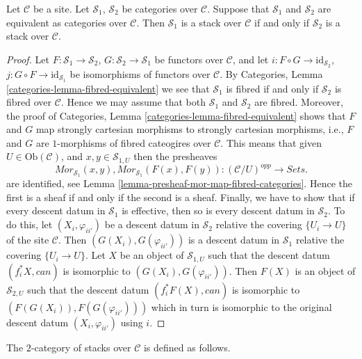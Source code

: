 \begin{lemma}
\label{lemma-stack-equivalent}
Let $\mathcal{C}$ be a site.
Let $\mathcal{S}_1$, $\mathcal{S}_2$ be categories over $\mathcal{C}$.
Suppose that $\mathcal{S}_1$ and $\mathcal{S}_2$ are equivalent
as categories over $\mathcal{C}$.
Then $\mathcal{S}_1$ is a stack over $\mathcal{C}$ if and only if
$\mathcal{S}_2$ is a stack over $\mathcal{C}$.
\end{lemma}

\begin{proof}
Let $F : \mathcal{S}_1 \to \mathcal{S}_2$,
$G : \mathcal{S}_2 \to \mathcal{S}_1$ be functors over $\mathcal{C}$, and let
$i : F \circ G \to \text{id}_{\mathcal{S}_2}$,
$j : G \circ F \to \text{id}_{\mathcal{S}_1}$ be isomorphisms of
functors over $\mathcal{C}$. By
Categories, Lemma \ref{categories-lemma-fibred-equivalent}
we see that $\mathcal{S}_1$ is fibred if and only if $\mathcal{S}_2$
is fibred over $\mathcal{C}$. Hence we may assume that both
$\mathcal{S}_1$ and $\mathcal{S}_2$ are fibred. Moreover, the proof of
Categories, Lemma \ref{categories-lemma-fibred-equivalent}
shows that $F$ and $G$ map strongly cartesian morphisms to strongly
cartesian morphisms, i.e., $F$ and $G$ are $1$-morphisms of fibred
cateogires over $\mathcal{C}$. This means that given
$U \in \text{Ob}(\mathcal{C})$, and $x, y \in \mathcal{S}_{1, U}$ then
the presheaves
$$
\mathit{Mor}_{\mathcal{S}_1}(x, y),
\mathit{Mor}_{\mathcal{S}_1}(F(x), F(y)) :
(\mathcal{C}/U)^{opp} \longrightarrow \textit{Sets}.
$$
are identified, see
Lemma \ref{lemma-presheaf-mor-map-fibred-categories}. Hence
the first is a sheaf if and only if the second is a sheaf.
Finally, we have to show that if every descent datum in $\mathcal{S}_1$
is effective, then so is every descent datum in $\mathcal{S}_2$.
To do this, let $(X_i, \varphi_{ii'})$ be a descent datum
in $\mathcal{S}_2$ relative the covering $\{U_i \to U\}$ of the site
$\mathcal{C}$. Then $(G(X_i), G(\varphi_{ii'}))$ is a descent datum
in $\mathcal{S}_1$ relative the covering $\{U_i \to U\}$.
Let $X$ be an object of $\mathcal{S}_{1, U}$ such that the
descent datum $(f_i^*X, can)$ is isomorphic to
$(G(X_i), G(\varphi_{ii'}))$. Then $F(X)$ is an object of $\mathcal{S}_{2, U}$
such that the descent datum $(f_i^*F(X), can)$ is isomorphic to
$(F(G(X_i)), F(G(\varphi_{ii'})))$ which in turn is isomorphic to
the original descent datum $(X_i, \varphi_{ii'})$ using $i$.
\end{proof}

\noindent
The $2$-category of stacks over $\mathcal{C}$
is defined as follows.

